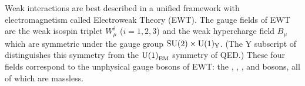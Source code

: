




Weak interactions are best described in a unified framework with electromagnetism called Electroweak Theory (EWT). The gauge fields of EWT are the weak isospin triplet $W^i_{\mu}$ ($i = 1, 2, 3$) and the weak hypercharge field $B_{\mu}$ which are symmetric under the gauge group $\mathrm{SU(2)} \times \mathrm{U(1)_{Y}}$. (The Y subscript of \UoneY distinguishes this symmetry from the $\mathrm{U(1)}_{\text{EM}}$ symmetry of QED.) These four fields correspond to the unphysical gauge bosons of EWT: the , , , and \PBewt bosons, all of which are massless. 

